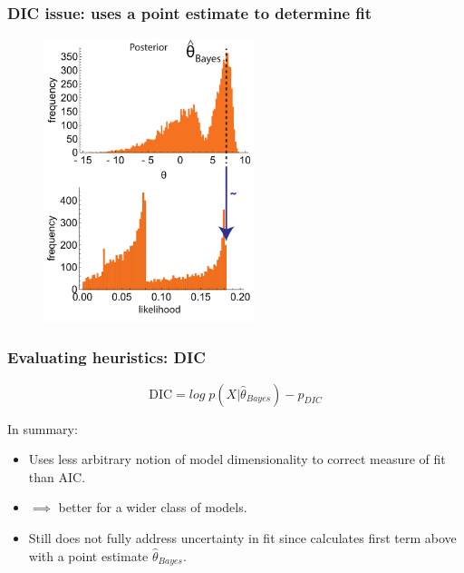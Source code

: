\documentclass[handout]{beamer}
\begin{document}
\begin{frame}
	\frametitle{DIC issue: uses a point estimate to determine fit}
	
		\begin{figure}[ht]
			\centerline{\includegraphics[width=0.55\textwidth]{figures/lec7_likelihood1.pdf}}
		\end{figure}
	
\end{frame}

\begin{frame}
	\frametitle{Evaluating heuristics: DIC}
	\begin{equation}
	\text{DIC} = log \;p(X|\hat{\theta}_{Bayes}) - p_{DIC}
	\end{equation}

 In summary:

\begin{itemize}
	\item<3-> Uses less arbitrary notion of model dimensionality to correct measure of fit than AIC.
	\item<4-> $\implies$ better for a wider class of models.
	\item<5-> Still does not fully address uncertainty in fit since calculates first term above with a point estimate $\hat{\theta}_{Bayes}$.
\end{itemize}

\end{frame}
\end{document}
